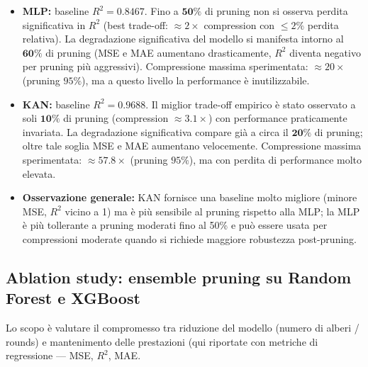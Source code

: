\documentclass[a4paper,12pt]{report}
\begin{document}
	\begin{itemize}
		\item \textbf{MLP:} baseline \(R^2=0.8467\). Fino a \(\mathbf{50\%}\) di pruning non si osserva perdita significativa in \(R^2\) (best trade-off: \(\approx 2\times\) compression con \(\le 2\%\) perdita relativa). La degradazione significativa del modello si manifesta intorno al \(\mathbf{60\%}\) di pruning (MSE e MAE aumentano drasticamente, \(R^2\) diventa negativo per pruning più aggressivi). Compressione massima sperimentata: \(\approx 20\times\) (pruning \(95\%\)), ma a questo livello la performance è inutilizzabile.
		\item \textbf{KAN:} baseline \(R^2=0.9688\). Il miglior trade-off empirico è stato osservato a soli \(\mathbf{10\%}\) di pruning (compression \(\approx 3.1\times\)) con performance praticamente invariata. La degradazione significativa compare già a circa il \(\mathbf{20\%}\) di pruning; oltre tale soglia MSE e MAE aumentano velocemente. Compressione massima sperimentata: \(\approx 57.8\times\) (pruning \(95\%\)), ma con perdita di performance molto elevata.
		\item \textbf{Osservazione generale:} KAN fornisce una baseline molto migliore (minore MSE, \(R^2\) vicino a 1) ma è più sensibile al pruning rispetto alla MLP; la MLP è più tollerante a pruning moderati fino al 50\% e può essere usata per compressioni moderate quando si richiede maggiore robustezza post-pruning.
	\end{itemize}
	
	\subsection{Ablation study: ensemble pruning su Random Forest e XGBoost}
	Lo scopo è valutare il compromesso tra riduzione del modello (numero di alberi / rounds) e mantenimento delle prestazioni (qui riportate con metriche di regressione — MSE, \(R^2\), MAE.
	
\end{document}
